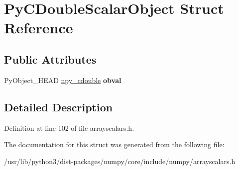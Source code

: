 \hypertarget{structPyCDoubleScalarObject}{}\section{Py\+C\+Double\+Scalar\+Object Struct Reference}
\label{structPyCDoubleScalarObject}
\subsection*{Public Attributes}
\begin{DoxyCompactItemize}
\item 
Py\+Object\+\_\+\+H\+E\+AD \hyperlink{structnpy__cdouble}{npy\+\_\+cdouble} {\bfseries obval}\hypertarget{structPyCDoubleScalarObject_ab1fabad1121738df8e8eeeb6f751d1a3}{}\label{structPyCDoubleScalarObject_ab1fabad1121738df8e8eeeb6f751d1a3}

\end{DoxyCompactItemize}


\subsection{Detailed Description}


Definition at line 102 of file arrayscalars.\+h.



The documentation for this struct was generated from the following file\+:\begin{DoxyCompactItemize}
\item 
/usr/lib/python3/dist-\/packages/numpy/core/include/numpy/arrayscalars.\+h\end{DoxyCompactItemize}
